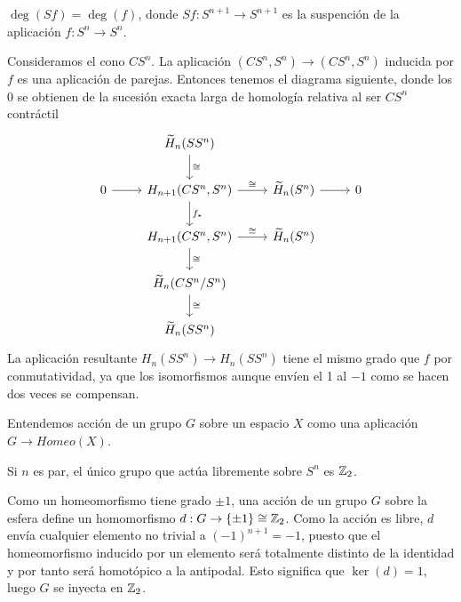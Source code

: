\documentclass[TA.tex]{subfiles}
\begin{document}
\begin{prop}\label{suspension}
$\deg(Sf)=\deg(f)$, donde $Sf:S^{n+1}\to S^{n+1}$ es la suspención de la aplicación $f:S^n\to S^n$. 
\end{prop}
\begin{dem}
Consideramos el cono $CS^n$. La aplicación $(CS^n,S^n)\to (CS^n,S^n)$ inducida por $f$ es una aplicación de parejas. Entonces tenemos el diagrama siguiente, donde los 0 se obtienen de la sucesión exacta larga de homología relativa al ser $CS^n$ contráctil
\[
\begin{tikzcd}
           & \widetilde{H}_n(SS^n)\arrow[d, "\cong"]& &\\
0\arrow[r] & H_{n+1}(CS^n, S^n)\arrow[r, "\cong"]\arrow[d, "f_*"] &\widetilde{H}_n(S^n)\arrow[r] & 0\\
           & H_{n+1}(CS^n, S^n)\arrow[r, "\cong"]\arrow[d, "\cong"] &\widetilde{H}_n(S^n)& \\
           & \widetilde{H}_n(CS^n/S^n)\arrow[d,"\cong"] & & \\
           & \widetilde{H}_n(SS^n)& &
\end{tikzcd}
\]
La aplicación resultante $H_n(SS^n)\to H_n(SS^n)$ tiene el mismo grado que $f$ por conmutatividad, ya que los isomorfismos aunque envíen el 1 al $-1$ como se hacen dos veces se compensan. 
\end{dem}

Entendemos acción de un grupo $G$ sobre un espacio $X$ como una aplicación $G\to Homeo(X)$. 

\begin{prop}
Si $n$ es par, el único grupo que actúa libremente sobre $S^n$ es $\mathbb{Z}_2$. 
\end{prop}
\begin{dem}
Como un homeomorfismo tiene grado $\pm 1$, una acción de un grupo $G$ sobre la esfera define un homomorfismo $d:G\to\{\pm 1\}\cong\mathbb{Z}_2$. Como la acción es libre, $d$ envía cualquier elemento no trivial a $(-1)^{n+1}=-1$, puesto que el homeomorfismo inducido por un elemento será totalmente distinto de la identidad y por tanto será homotópico a la antipodal. Esto significa que $\ker(d)=1$, luego $G$ se inyecta en $\mathbb{Z}_2$. 
\end{dem}
\end{document}
